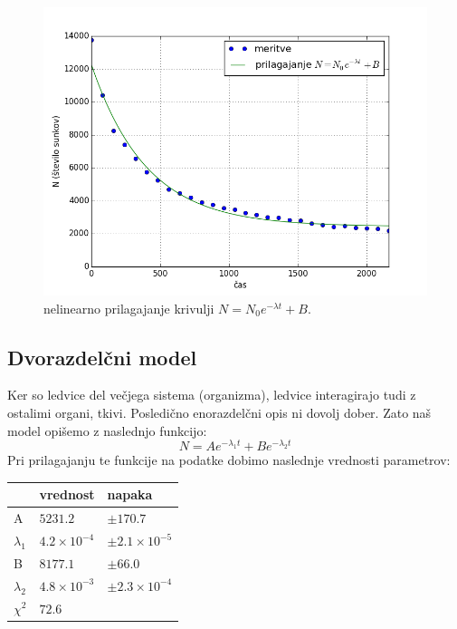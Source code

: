 \documentclass[slovene,11pt,a4paper]{article}
\numberwithin{equation}{section} %
\numberwithin{figure}{section} %
\numberwithin{table}{section} %
\begin{document}
\begin{figure}[h]
\centering
\includegraphics[scale=0.55]{slike/druga.png}
\caption[farmacevt-dodatni-parameter]{nelinearno prilagajanje krivulji $N=N_0 e^{-\lambda t}+B$.}
\label{fig:druga-2}
\end{figure}
\pagebreak


\subsection{Dvorazdelčni model}
Ker so ledvice del večjega sistema (organizma), ledvice interagirajo tudi z ostalimi organi, tkivi. Posledično enorazdelčni opis ni dovolj dober. Zato naš model opišemo z naslednjo funkcijo:
\begin{equation}
\label{dvorazdelčni-1}
N=A e^{- \lambda_1 t} + B e^{- \lambda_2 t}
\end{equation}
Pri prilagajanju te funkcije na podatke dobimo naslednje vrednosti parametrov:
\begin{table}[h]
\begin{center}

\begin{tabular}{l|l|l|}
\cline{2-3}
                                  & vrednost      & napaka           \\ \hline
\multicolumn{1}{|l|}{A}           & $5231.2$      & $\pm170.7$       \\ \hline
\multicolumn{1}{|l|}{$\lambda_1$} & $4.2\times10^{-4}$ & $\pm2.1\times10^{-5}$ \\ \hline
\multicolumn{1}{|l|}{B}           & $8177.1$      & $\pm 66.0$       \\ \hline
\multicolumn{1}{|l|}{$\lambda_2$} & $4.8\times10^{-3}$ & $\pm2.3\times10^{-4}$    \\ \hline
\multicolumn{1}{|l|}{$\chi^2$}    & $72.6$        &                  \\ \hline

\end{tabular}
\end{center}
\end{table}
\end{document}
